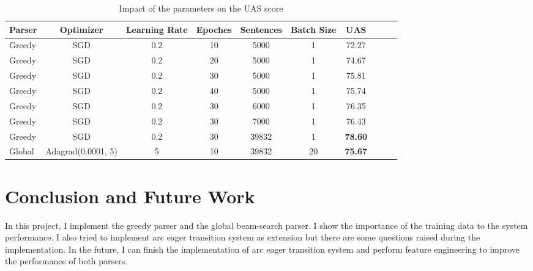 \documentclass[11pt,a4paper]{article}
\begin{document}
\begin{table}
\caption{Impact of the parameters on the UAS score}
\label{data-table}
\begin{tabularx}{\textwidth}{@{}l*{8}{C}c@{}}
\toprule
Parser    & Optimizer & Learning Rate & Epoches & Sentences     & Batch Size     & UAS    \\    
\midrule
Greedy    & SGD        & 0.2              & 10         & 5000          & 1         & 72.27  \\    
Greedy    & SGD        & 0.2            & 20      & 5000           & 1                & 74.67  \\   
Greedy    & SGD       & 0.2             & 30        & 5000          & 1               & 75.81  \\   
Greedy    & SGD       & 0.2              & 40         & 5000         & 1               & 75.74  \\   
\addlinespace
Greedy    & SGD       & 0.2              & 30         & 6000          & 1              & 76.35  \\   
Greedy    & SGD       & 0.2              & 30      & 7000         & 1               & 76.43  \\  
Greedy    & SGD       & 0.2              & 30      & 39832          & 1                & \textbf{78.60}  \\    
Global    & Adagrad(0.0001, 5) & 5    & 10      & 39832          & 20               & \textbf{75.67}  \\ 
\bottomrule
\end{tabularx}
\end{table} 


\section{Conclusion and Future Work}

In this project, I implement the greedy parser and the global beam-search parser.
I show the importance of the training data to the system performance. I also tried to 
implement arc eager transition system as extension but there are some questions raised during
the implementation. In the future, I can finish the implementation of arc eager transition system 
and perform feature engineering to improve the performance of both parsers.



\end{document}

